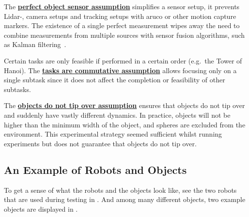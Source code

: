 The \hyperref[assumption:perfect_object_sensor]{\textbf{perfect object sensor assumption}} simplifies a sensor setup, it prevents Lidar-, camera setups and tracking setups with aruco or other motion capture markers. The existence of a single perfect measurement wipes away the need to combine measurements from multiple sources with sensor fusion algorithms, such as Kalman filtering~\cite{verhaegen_filtering_2007}.\bs

Certain tasks are only feasible if performed in a certain order (e.g.~the Tower of Hanoi). The \hyperref[assumption:order_does_not_matter]{\textbf{tasks are commutative assumption}} allows focusing only on a single subtask since it does not affect the completion or feasibility of other subtasks.\bs

The \hyperref[assumption:no_tipping]{\textbf{objects do not tip over assumption}} ensures that objects do not tip over and suddenly have vastly different dynamics. In practice, objects will not be higher than the minimum width of the object, and spheres are excluded from the environment. This experimental strategy seemed sufficient whilst running experiments but does not guarantee that objects do not tip over.

\subsection{An Example of Robots and Objects}
To get a sense of what the robots and the objects look like, see the two robots that are used during testing in . And among many different objects, two example objects are displayed in .

